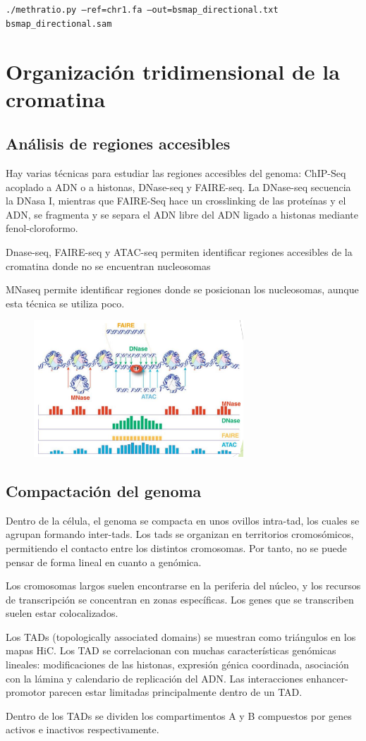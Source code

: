 \texttt{./methratio.py --ref=chr1.fa --out=bsmap\_directional.txt bsmap\_directional.sam}

\section{Organización tridimensional de la cromatina}
\subsection{Análisis de regiones accesibles}
Hay varias técnicas para estudiar las regiones accesibles del genoma: ChIP-Seq acoplado a ADN o a histonas, DNase-seq y FAIRE-seq. La DNase-seq secuencia la DNasa I, mientras que FAIRE-Seq hace un crosslinking de las proteínas y el ADN, se fragmenta y se separa el ADN libre del ADN ligado a histonas mediante fenol-cloroformo. 

Dnase-seq, FAIRE-seq y ATAC-seq permiten identificar regiones accesibles de la cromatina donde no se encuentran nucleosomas

MNaseq permite identificar regiones donde se posicionan los nucleosomas, aunque esta técnica se utiliza poco.

\begin{figure}[h]
\centering
\includegraphics[width = 0.7\textwidth]{figs/epig-seqs.png}
\end{figure}

\subsection{Compactación del genoma}
Dentro de la célula, el genoma se compacta en unos ovillos intra-tad, los cuales se agrupan formando inter-tads. Los tads se organizan en territorios cromosómicos, permitiendo el contacto entre los distintos cromosomas. Por tanto, no se puede pensar de forma lineal en cuanto a genómica. 

Los cromosomas largos suelen encontrarse en la periferia del núcleo, y los recursos de transcripción se concentran en zonas específicas. Los genes que se transcriben suelen estar colocalizados. 

Los TADs (topologically associated domains) se muestran como triángulos en los mapas HiC. Los TAD se correlacionan con muchas características genómicas lineales: modificaciones de las histonas, expresión génica coordinada, asociación con la lámina y calendario de replicación del ADN. Las interacciones enhancer-promotor parecen estar limitadas principalmente dentro de un TAD.

Dentro de los TADs se dividen los compartimentos A y B compuestos por genes activos e inactivos respectivamente. 